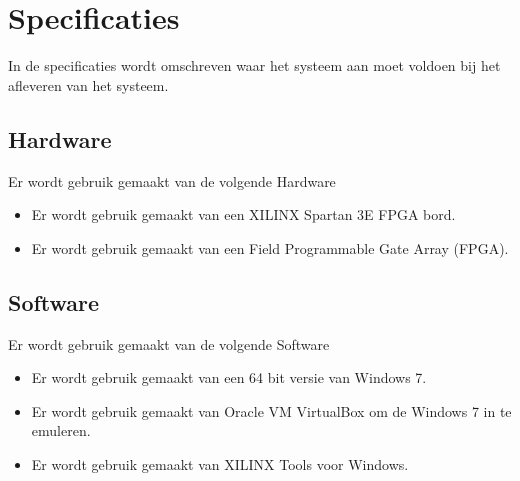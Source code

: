 \chapter{Specificaties}

In de specificaties wordt omschreven waar het systeem aan moet voldoen bij het afleveren van het systeem.

\section{Hardware}
Er wordt gebruik gemaakt van de volgende Hardware

\begin{itemize}
	\item Er wordt gebruik gemaakt van een XILINX Spartan 3E FPGA bord.
	\item Er wordt gebruik gemaakt van een Field Programmable Gate Array (FPGA). 
\end{itemize}

\section{Software}
 Er wordt gebruik gemaakt van de volgende Software
\begin{itemize}
	\item Er wordt gebruik gemaakt van een 64 bit versie van Windows 7.
	\item Er wordt gebruik gemaakt van Oracle VM VirtualBox om de Windows 7 in te emuleren.
	\item Er wordt gebruik gemaakt van XILINX Tools voor Windows.
\end{itemize}